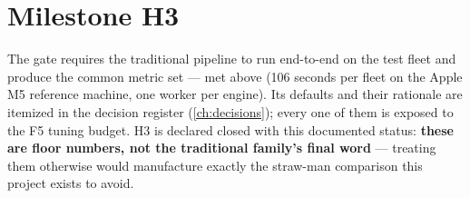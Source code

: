 \section{Milestone H3}
\label{sec:h3}

The gate requires the traditional pipeline to run end-to-end on the test fleet and produce the
common metric set --- met above (106 seconds per fleet on the Apple M5 reference machine, one worker per engine). Its
defaults and their rationale are itemized in the decision register
(\cref{ch:decisions}); every one of them is exposed to the F5 tuning budget. H3 is declared
closed with this documented status: \textbf{these are floor numbers, not the traditional
family's final word} --- treating them otherwise would manufacture exactly the straw-man
comparison this project exists to avoid.
